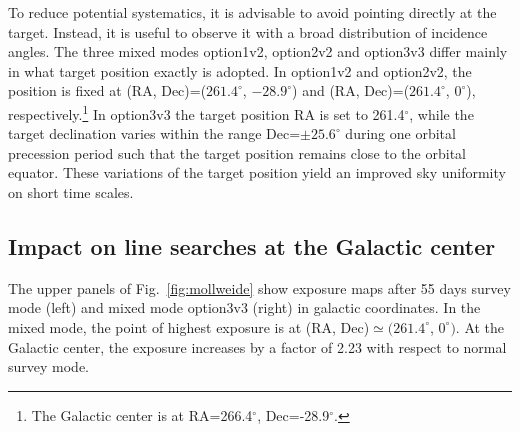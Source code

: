 \documentclass[aps,prd,superscriptaddress,nofootinbib,fixlfloat, 12pt]{revtex4-1}
\begin{document}
To reduce potential systematics, it is advisable to avoid pointing directly at
the target. Instead, it is useful to observe it with a broad distribution of
incidence angles. The three mixed modes option1v2, option2v2
and option3v3 differ mainly in what target position exactly is adopted.
In option1v2 and option2v2, the position is fixed at (RA,
Dec)=($261.4^\circ$, $-28.9^\circ$) and (RA, Dec)=($261.4^\circ$, $0^\circ$),
respectively.\footnote{The Galactic center is at RA=266.4$^\circ$,
Dec=-28.9$^\circ$.}  In option3v3 the target position RA is set to
261.4$^\circ$, while the target declination varies within the
range Dec=$\pm25.6^\circ$ during one orbital precession period such that the
target position remains close to the orbital equator.  These variations of the target
position yield an improved sky uniformity on short time scales. 

\subsection{Impact on line searches at the Galactic center}
The upper panels of Fig.~\ref{fig:mollweide} show exposure maps after 55 days
survey mode (left) and mixed mode option3v3 (right) in galactic
coordinates.  In the mixed mode, the point of highest exposure is at (RA,
Dec)$\simeq(261.4^\circ$, $0^\circ)$. At the Galactic center, the exposure increases by a
factor of 2.23 with respect to normal survey mode.
\end{document}
